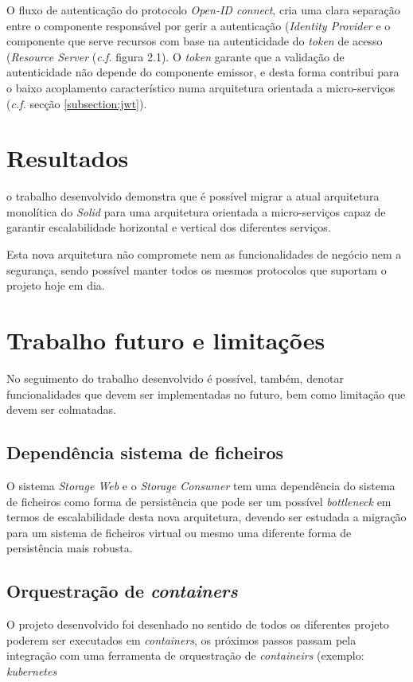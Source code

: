 O fluxo de autenticação do protocolo \emph{Open-ID connect}, cria uma clara separação entre o componente responsável por gerir a autenticação (\emph{Identity Provider} e o componente que serve recursos com base na autenticidade do \emph{token} de acesso (\emph{Resource Server} (\emph{c.f.} figura 2.1). O \emph{token} garante que a validação de autenticidade não depende do componente emissor, e desta forma contribui para o baixo acoplamento característico numa arquitetura orientada a micro-serviços (\emph{c.f.} secção \ref{subsection:jwt}).


\section{Resultados}
o trabalho desenvolvido demonstra que é possível migrar a atual arquitetura monolítica do \emph{Solid} para uma arquitetura orientada a micro-serviços capaz de garantir escalabilidade horizontal e vertical dos diferentes serviços.

Esta nova arquitetura não compromete nem as funcionalidades de negócio nem a segurança, sendo possível manter todos os mesmos protocolos que suportam o projeto hoje em dia.

\section{Trabalho futuro e limitações}

No seguimento do trabalho desenvolvido é possível, também, denotar funcionalidades que devem ser implementadas no futuro, bem como limitação que devem ser colmatadas.

\subsection{Dependência sistema de ficheiros}
O sistema \emph{Storage Web} e o \emph{Storage Consumer} tem uma dependência do sistema de ficheiros como forma de persistência que pode ser um possível \emph{bottleneck} em termos de escalabilidade desta nova arquitetura, devendo ser estudada a migração para um sistema de ficheiros virtual ou mesmo uma diferente forma de persistência mais robusta.
\subsection{Orquestração de \emph{containers}} O projeto desenvolvido foi desenhado no sentido de todos os diferentes projeto poderem ser executados em \emph{containers}, os próximos passos passam pela integração com uma ferramenta de orquestração de \emph{containeirs} (exemplo: \emph{kubernetes}
